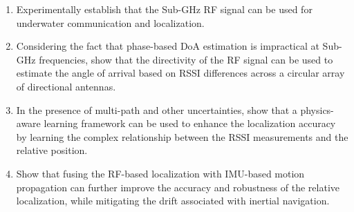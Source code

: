 \documentclass[subscriptcorrection,upint,varvw,barcolor=Goldenrod3,mathalfa=cal=euler,balance,hyphenate,pdf-a]{asmejour}
\begin{document}
\begin{enumerate}
\item Experimentally establish that the Sub-GHz RF signal can be used for underwater communication and localization.
\item Considering the fact that phase-based DoA estimation is impractical at Sub-GHz frequencies, show that the directivity of the RF signal can be used to estimate the angle of arrival based on RSSI differences across a circular array of directional antennas.
\item In the presence of multi-path and other uncertainties, show that a physics-aware learning framework can be used to enhance the localization accuracy by learning the complex relationship between the RSSI measurements and the relative position.
\item Show that fusing the RF-based localization with IMU-based motion propagation can further improve the accuracy and robustness of the relative localization, while mitigating the drift associated with inertial navigation.
\end{enumerate}

\end{document}
